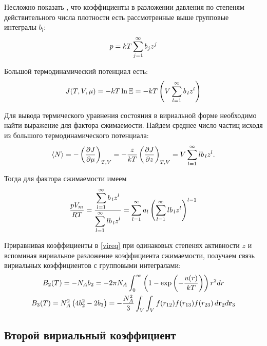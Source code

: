 Несложно показать \cite{meyson}, что коэффициенты в разложении давления по степеням действительного числа плотности есть рассмотренные выше групповые интегралы $b_l$: 
\vverh
\begin{gather}
	p = k T \sum_{j=1}^\infty b_j z^j \notag
\end{gather}

Большой термодинамический потенциал есть:
\vverh
\begin{gather}
	J(T, V, \mu) = - k T \ln \Xi = -k T \left( V \sum_{l=1}^\infty b_{\, l} z^l \right) \notag
\end{gather}

Для вывода термического уравнения состояния в вириальной форме необходимо найти выражение для фактора сжимаемости. Найдем среднее число частиц исходя из большого термодинамического потенциала:
\vverh
\begin{gather}
	\langle N \rangle = - \left( \frac{\partial J}{\partial \mu} \right)_{T, V} = - \frac{z}{kT} \left( \frac{\partial J}{\partial z} \right)_{T, V} = V \sum_{l = 1}^\infty l b_{\, l} z^l. \notag
\end{gather}

Тогда для фактора сжимаемости имеем
\vverh
\begin{gather}
	\frac{p V_m}{RT} = \frac{\displaystyle \sum_{l = 1}^\infty b_{\, l} z^l}{\displaystyle \sum_{l = 1}^\infty l b_{\, l} z^l} = \sum_{l = 1}^\infty a_l \left( \sum_{l = 1}^\infty  l b_{\, l} z^l \right)^{l - 1} \label{vireq}
\end{gather}

Приравнивая коэффициенты в \eqref{vireq} при одинаковых степенях активности $z$ и вспоминая вириальное разложение коэффициента сжимаемости, получаем связь вириальных коэффициентов с групповыми интегралами:
\vverh
\begin{gather}
	B_2(T) = - N_A b_2 = - 2 \pi N_A \int_0^\infty \left( 1 - \exp \left( -\frac{u(r)}{kT} \right) \right) r^2 d r \notag  \\
	B_3(T) = N_A^2 \left( 4 b_2^2 - 2 b_3 \right) = - \frac{N_A^2}{3} \int_V \int_V f(r_{12}) f(r_{13}) f(r_{23}) \, d \mathbf{r}_2 d \mathbf{r}_3 \notag
\end{gather}

\subsection{Второй вириальный коэффициент}

